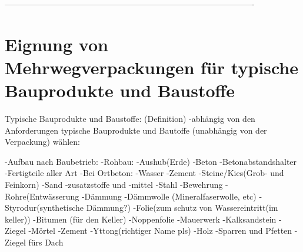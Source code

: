 -------------------------------------------------------------------------------------------

\section{Eignung von Mehrwegverpackungen für typische Bauprodukte und Baustoffe}
\label{sec:Eignung von Verpackungen von Bauprodukten und Baustoffen:Eignung von Mehrwegverpackungen für typische Bauprodukte und Baustoffe}


Typische Bauprodukte und Baustoffe: (Definition)
-abhängig von den Anforderungen
typische Bauprodukte und Bautoffe (unabhängig von der Verpackung) wählen:
    
    -Aufbau nach Baubetrieb:
    -Rohbau:
        -Aushub(Erde)
        -Beton
            -Betonabstandshalter
            -Fertigteile aller Art
            -Bei Ortbeton:
                -Wasser
                -Zement
                -Steine/Kies(Grob- und Feinkorn)
                -Sand
                -zusatzstoffe und -mittel
        -Stahl
            -Bewehrung
        -Rohre(Entwässerung
        -Dämmung
            -Dämmwolle (Mineralfaserwolle, etc)
            -Styrodur(synthetische Dämmung?)
        -Folie(zum schutz von Wassereintritt(im keller))
        -Bitumen (für den Keller)
        -Noppenfolie
        -Mauerwerk
            -Kalksandstein
            -Ziegel
            -Mörtel
            -Zement
            -Yttong(richtiger Name pls)
        -Holz
            -Sparren und Pfetten
        -Ziegel fürs Dach
        
